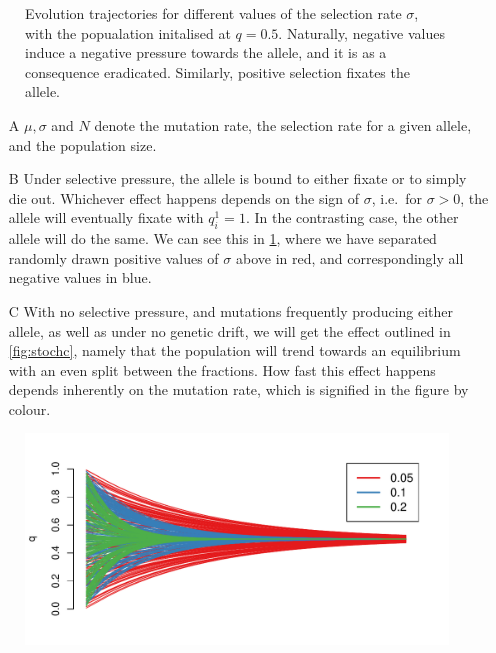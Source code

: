 \documentclass[10pt]{article}\usepackage[]{graphicx}\usepackage[]{color}
\makeatletter
\def\maxwidth{ %
  \ifdim\Gin@nat@width>\linewidth
    \linewidth
  \else
    \Gin@nat@width
  \fi
}
\theoremstyle{plain}
\makeatother
\begin{document}
\begin{multicols*}{2}
\begin{Schunk}
\begin{figure}[H]
{}

\caption[Evolution trajectories for different values of the selection rate $\sigma$, with the popualation initalised at $q = 0.5$]{Evolution trajectories for different values of the selection rate $\sigma$, with the popualation initalised at $q = 0.5$. Naturally, negative values induce a negative pressure towards the allele, and it is as a consequence eradicated. Similarly, positive selection fixates the allele.}\label{fig:3_selection}
\end{figure}
\end{Schunk}
\begin{enumerate}
  \item[A] $\mu, \sigma$ and $N$ denote the mutation rate, the selection
    rate for a given allele, and the population size.
  \item[B] Under selective pressure, the allele is bound to either fixate or to
    simply die out. Whichever effect happens depends on the sign of $\sigma$,
    i.e.\ for $\sigma > 0$, the allele will eventually fixate with $q^1_i = 1$.
    In the contrasting case, the other allele will do the same. We can see this
    in \cref{fig:3_selection}, where we have separated randomly drawn positive values of $\sigma$ above in red, and correspondingly all negative values in blue.
  \item[C] With no selective pressure, and mutations frequently producing either allele, as well as under no genetic drift, we will get the effect outlined in \cref{fig:stochc}, namely that the population will trend towards an equilibrium with an even split between the fractions. How fast this effect happens depends inherently on the mutation rate, which is signified in the figure by colour.
\end{enumerate}
\begin{Schunk}
\begin{figure}[H]

{\centering \includegraphics[width=\maxwidth]{figure/twocolumn-stochc-1} 

}
\end{figure}
\end{Schunk}
\end{multicols*}
\end{document}
